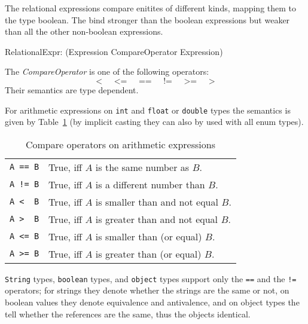 The relational expressions compare enitites of different kinds, mapping them to the type boolean.
The bind stronger than the boolean expressions but weaker than all the other non-boolean expressions.

\begin{rail}
 RelationalExpr: (Expression CompareOperator Expression)
\end{rail}

The \emph{CompareOperator} is one of the following operators:
\[ \texttt{<} \;\;\;\;\; \texttt{<=} \;\;\;\;\; \texttt{==} \;\;\;\;\; \texttt{!=} \;\;\;\;\; \texttt{>=} \;\;\;\;\; \texttt{>} \]
Their semantics are type dependent.

For arithmetic expressions on \texttt{int} and \texttt{float} or \texttt{double} types 
the semantics is given by Table~\ref{compandarithmetic} (by implicit casting they can also by used with all enum types).

\begin{table}[htbp]
  \centering
  \begin{tabularx}{\linewidth}{|l|X|} \hline
    \texttt{A == B} & True, iff $A$ is the same number as $B$. \\
    \texttt{A != B} & True, iff $A$ is a different number than $B$. \\
    \texttt{A <\ \ B} & True, iff $A$ is smaller than and not equal $B$. \\
    \texttt{A >\ \ B} & True, iff $A$ is greater than and not equal $B$. \\
    \texttt{A <= B} & True, iff $A$ is smaller than (or equal) $B$. \\
    \texttt{A >= B} & True, iff $A$ is greater than (or equal) $B$. \\ \hline
  \end{tabularx}
  \caption{Compare operators on arithmetic expressions}
  \label{compandarithmetic}
\end{table}

\texttt{String} types, \texttt{boolean} types, and \texttt{object} types support only the \texttt{==} and the \texttt{!=} operators;
for strings they denote whether the strings are the same or not, 
on boolean values they denote equivalence and antivalence, 
and on object types the tell whether the references are the same, thus the objects identical.

